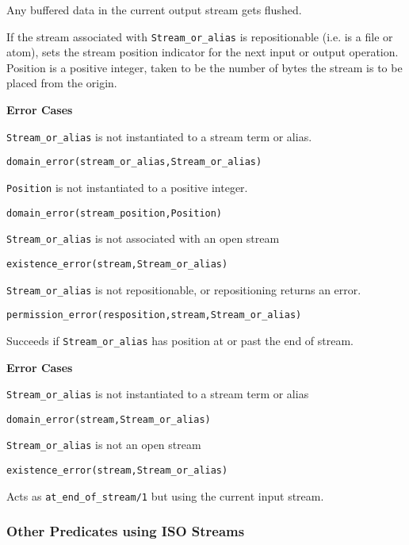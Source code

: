 \begin{description}
%
Any buffered data in the current output stream gets flushed.

%
If the stream associated with {\tt Stream\_or\_alias} is
repositionable (i.e. is a file or atom), sets the stream position
indicator for the next input or output operation. Position is a
positive integer, taken to be the number of bytes the stream is to be
placed from the origin.

{\bf Error Cases}
\bi
\item 	{\tt Stream\_or\_alias} is not instantiated to a stream term
or alias.
\bi
\item 	{\tt domain\_error(stream\_or\_alias,Stream\_or\_alias)}
\ei
\item 	{\tt Position} is not instantiated to a positive integer.
\bi
\item 	{\tt domain\_error(stream\_position,Position)}
\ei
\item 	{\tt Stream\_or\_alias} is not associated with an open stream
\bi
\item 	{\tt existence\_error(stream,Stream\_or\_alias)}
\ei
\item 	{\tt Stream\_or\_alias} is not repositionable, or
	repositioning returns an error. 
\bi
\item 	{\tt permission\_error(resposition,stream,Stream\_or\_alias)}
\ei
\ei

%
Succeeds if {\tt Stream\_or\_alias} has position at or past the end of
stream.

{\bf Error Cases}
\bi
\item 	{\tt Stream\_or\_alias} is not instantiated to a stream term
or alias
\bi
\item 	{\tt domain\_error(stream,Stream\_or\_alias)}
\ei
\item 	{\tt Stream\_or\_alias} is not an open stream
\bi
\item 	{\tt existence\_error(stream,Stream\_or\_alias)}
\ei
\ei
%

%
Acts as {\tt at\_end\_of\_stream/1} but using the current input
stream.

\end{description}

\subsubsection{Other Predicates using ISO Streams}

